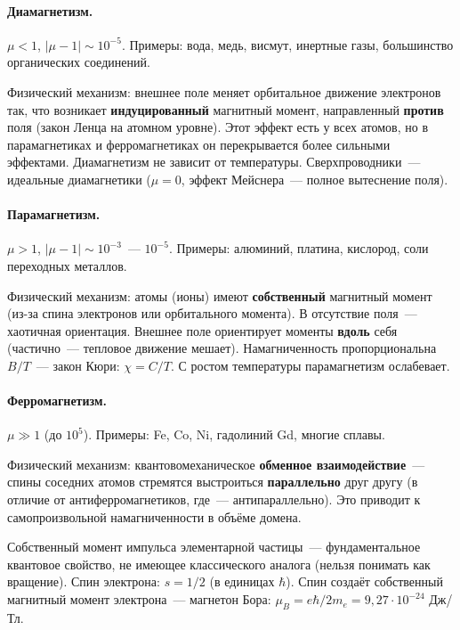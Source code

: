 \documentclass[12pt]{article}
\begin{document}
\paragraph{Диамагнетизм.}
$\mu < 1$, $|\mu - 1| \sim 10^{-5}$. Примеры: вода, медь, висмут, инертные
газы, большинство органических соединений.

Физический механизм: внешнее поле меняет орбитальное движение электронов так,
что возникает \textbf{индуцированный} магнитный момент, направленный
\textbf{против} поля (закон Ленца на атомном уровне). Этот эффект есть у всех
атомов, но в парамагнетиках и ферромагнетиках он перекрывается более сильными
эффектами. Диамагнетизм не зависит от температуры. Сверхпроводники~---
идеальные диамагнетики ($\mu = 0$, эффект Мейснера~--- полное вытеснение поля).

\paragraph{Парамагнетизм.}
$\mu > 1$, $|\mu - 1| \sim 10^{-3}$~--- $10^{-5}$. Примеры: алюминий, платина,
кислород, соли переходных металлов.

Физический механизм: атомы (ионы) имеют \textbf{собственный} магнитный момент
(из-за спина электронов или орбитального момента). В отсутствие поля~--- хаотичная
ориентация. Внешнее поле ориентирует моменты \textbf{вдоль} себя (частично~---
тепловое движение мешает). Намагниченность пропорциональна $B/T$~--- закон
Кюри: $\chi = C/T$. С ростом температуры парамагнетизм ослабевает.

\paragraph{Ферромагнетизм.}
$\mu \gg 1$ (до $10^5$). Примеры: Fe, Co, Ni, гадолиний Gd, многие сплавы.

Физический механизм: квантовомеханическое \textbf{обменное взаимодействие}~---
спины соседних атомов стремятся выстроиться \textbf{параллельно} друг другу
(в отличие от антиферромагнетиков, где~--- антипараллельно). Это приводит к
самопроизвольной намагниченности в объёме домена.

\begin{definition}[Спин]
    Собственный момент импульса элементарной частицы~--- фундаментальное
    квантовое свойство, не имеющее классического аналога (нельзя понимать
    как вращение). Спин электрона: $s = 1/2$ (в единицах $\hbar$). Спин
    создаёт собственный магнитный момент электрона~--- магнетон Бора:
    $\mu_B = e\hbar/2m_e = 9{,}27\cdot10^{-24}$ Дж/Тл.
\end{definition}
\end{document}
